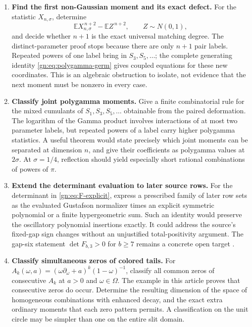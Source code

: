 \begin{enumerate}[label=\textbf{Q\arabic*.},leftmargin=*]

\item \textbf{Find the first non-Gaussian moment and its exact defect.}
For the statistic $X_{n,\sigma}$, determine
\[
 \mathbb E X_{n,\sigma}^{\,n+2}
       -\mathbb E Z^{\,n+2},\qquad Z\sim N(0,1),
\]
and decide whether $n+1$ is the exact universal matching degree.
The distinct-parameter proof stops because there are only
$n+1$ pair labels. Repeated powers of one label bring in
$S_3,S_5,\ldots$; the complete generating identity
\eqref{gn:eq:polygamma-germ} gives coupled equations for these
new coordinates. This is an algebraic obstruction to isolate,
not evidence that the next moment must be nonzero in every case.

\item \textbf{Classify joint polygamma moments.}
Give a finite combinatorial rule for the mixed cumulants of
$S_1,S_3,S_5,\ldots$ obtainable from the paired deformation.
The logarithm of the Gamma product involves interactions of at
most two parameter labels, but repeated powers of a label carry
higher polygamma statistics. A useful theorem would state
precisely which joint moments can be separated at dimension $n$,
and give their coefficients as polygamma values at $2\sigma$.
At $\sigma=1/4$, reflection should yield especially short
rational combinations of powers of $\pi$.

\item \textbf{Extend the determinant evaluation to later source rows.}
For the determinant in \eqref{gn:eq:F-explicit}, express a
prescribed family of later row sets as the evaluated Gustafson
normalizer times an explicit symmetric polynomial or a finite
hypergeometric sum. Such an identity would preserve the
oscillatory polynomial insertions exactly. It could address
the source's fixed-gap sign changes without an unjustified
total-positivity argument. The gap-six statement
$\det F_{b,3}>0$ for $b\ge7$ remains a concrete open target
\cite{repoordered}.

\item \textbf{Classify simultaneous zeros of colored tails.}
For
$A_k(\omega,a)=(\omega\partial_\omega+a)^k(1-\omega)^{-1}$,
classify all common zeros of consecutive $A_k$ at $a>0$ and
$\omega\in\Omega$. The example in this article proves that
consecutive zeros do occur. Determine the resulting dimension
of the space of homogeneous combinations with enhanced decay,
and the exact extra ordinary moments that each zero pattern
permits. A classification on the unit circle may be simpler
than one on the entire slit domain.


\end{enumerate}
